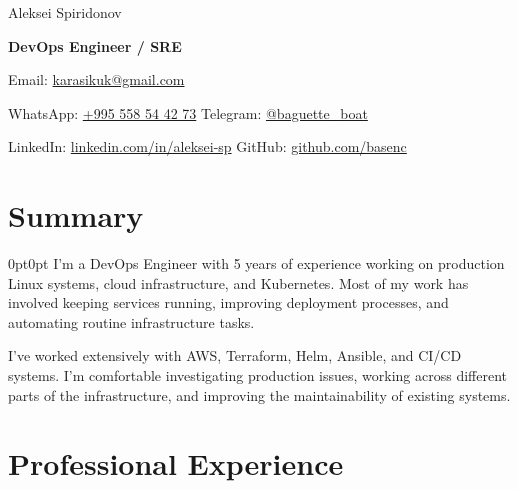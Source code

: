 \documentclass[12pt,letterpaper]{article}
\newenvironment{block}{%
  \begin{adjustwidth}{0pt}{0pt}}{%
  \end{adjustwidth}}
\begin{document}
\begin{center}
  \linespread{1.4}\selectfont
  {\fontsize{25pt}{30pt}\selectfont Aleksei Spiridonov\par}
  \vspace{6pt}

  \textbf{DevOps Engineer / SRE}\par
  \vspace{6pt}

  \;
  Email: \href{mailto:karasikuk@gmail.com}
    {karasikuk@gmail.com}\hspace{10pt}%

  \;
  WhatsApp: \href{https://wa.me/995558544273}
    {+995 558 54 42 73}\hspace{10pt}%
  \;
  Telegram: \href{https://t.me/baguette_boat}
    {@baguette\_boat}\par

  \;
  LinkedIn: \href{https://www.linkedin.com/in/aleksei-sp}
    {linkedin.com/in/aleksei-sp}\hspace{10pt}%
  \;
  GitHub: \href{https://github.com/basenc}
    {github.com/basenc}\par
\end{center}

\section{Summary}
\begin{block}
  I'm a DevOps Engineer with 5 years of experience working on
  production Linux systems, cloud infrastructure, and Kubernetes.
  Most of my work has involved keeping services running,
  improving deployment processes, and automating routine
  infrastructure tasks.

  \vspace{4pt}

  I've worked extensively with AWS, Terraform, Helm, Ansible,
  and CI/CD systems. I'm comfortable investigating production
  issues, working across different parts of the infrastructure,
  and improving the maintainability of existing systems.
\end{block}

\section{Professional Experience}
\end{document}
